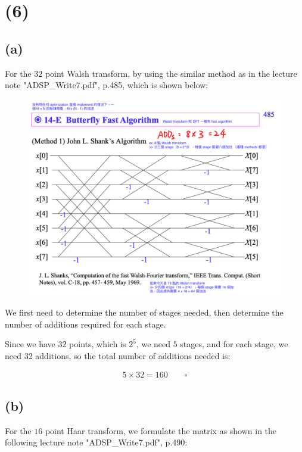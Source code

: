 \documentclass{article}
\begin{document}
\section*{(6)}

\subsection*{(a)}

For the $32$ point Walsh transform, 
by using the similar method as in the lecture note "ADSP\_Write7.pdf", p.485, 
which is shown below:

\begin{figure}[H]
    \centering
    \includegraphics[width=\textwidth]{HW5_img/6_a.png}
\end{figure}

We first need to determine the number of stages needed, 
then determine the number of additions required for each stage.

Since we have $32$ points, which is $2^5$, we need $5$ stages, 
and for each stage, we need $32$ additions, so the total number of additions needed is:

\begin{align*}
    5 \times 32 = 160 \qquad \square
\end{align*}

\subsection*{(b)}

For the $16$ point Haar transform, 
we formulate the matrix as shown in the following lecture note "ADSP\_Write7.pdf", p.490:
\end{document}
